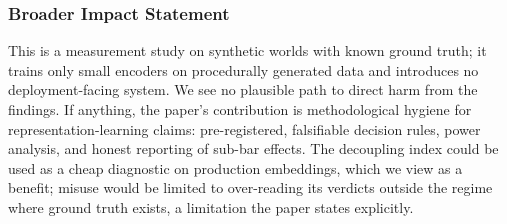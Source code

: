 \documentclass[10pt]{article}
\begin{document}
\subsubsection*{Broader Impact Statement}
This is a measurement study on synthetic worlds with known ground truth; it
trains only small encoders on procedurally generated data and introduces no
deployment-facing system. We see no plausible path to direct harm from the
findings. If anything, the paper's contribution is methodological hygiene for
representation-learning claims: pre-registered, falsifiable decision rules,
power analysis, and honest reporting of sub-bar effects. The decoupling index
could be used as a cheap diagnostic on production embeddings, which we view
as a benefit; misuse would be limited to over-reading its verdicts outside
the regime where ground truth exists, a limitation the paper states
explicitly.



\end{document}
